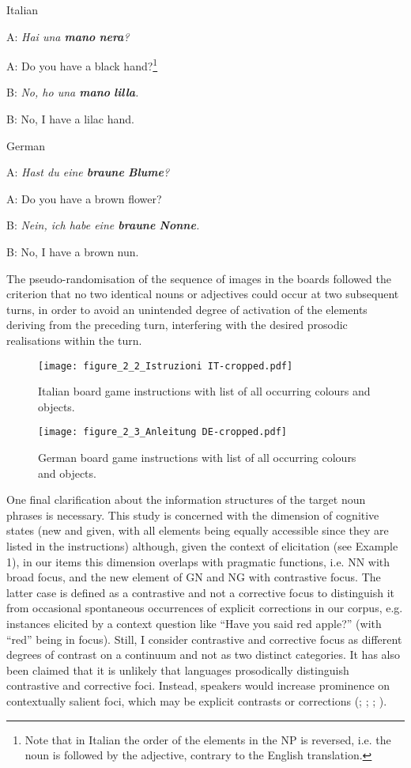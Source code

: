 \ea
\ea Italian

A: \textit{Hai una \textbf{mano} \textbf{nera}?}

A: Do you have a black hand?\footnote{Note that in Italian the order of the elements in the NP is reversed, i.e. the noun is followed by the adjective, contrary to the English translation.}

B: \textit{No, ho una \textbf{mano} \textbf{lilla}.}

B: No, I have a lilac hand.

\ex German

A: \textit{Hast du eine \textbf{braune} \textbf{Blume}?}

A: Do you have a brown flower?

B: \textit{Nein, ich habe eine \textbf{braune} \textbf{Nonne}.}

B: No, I have a brown nun.
\z
\z

The pseudo-randomisation of the sequence of images in the boards followed the criterion that no two identical nouns or adjectives could occur at two subsequent turns, in order to avoid an unintended degree of activation of the elements deriving from the preceding turn, interfering with the desired prosodic realisations within the turn.



\begin{figure}
\texttt{[image: figure\_2\_2\_Istruzioni IT-cropped.pdf]}
\caption{Italian board game instructions with list of all occurring colours and objects.}
\label{fig:2.2}
\end{figure}

  
\begin{figure}
\texttt{[image: figure\_2\_3\_Anleitung DE-cropped.pdf]}
\caption{German board game instructions with list of all occurring colours and objects.}
\label{fig:2.3}
\end{figure}

One final clarification about the information structures of the target noun phrases is necessary. This study is concerned with the dimension of cognitive states (new and given, with all elements being equally accessible since they are listed in the instructions) although, given the context of elicitation (see Example 1), in our items this dimension overlaps with pragmatic functions, i.e. NN with broad focus, and the new element of GN and NG with contrastive focus. The latter case is defined as a contrastive and not a corrective focus to distinguish it from occasional spontaneous occurrences of explicit corrections in our corpus, e.g. instances elicited by a context question like “Have you said red apple?” (with “red” being in focus). Still, I consider contrastive and corrective focus as different degrees of contrast on a continuum and not as two distinct categories. It has also been claimed that it is unlikely that languages prosodically distinguish contrastive and corrective foci. Instead, speakers would increase prominence on contextually salient foci, which may be explicit contrasts or corrections (\citealt{BaumannEtAl2006}; \citealt{Calhoun2009}; \citealt{Féry2013}; \citealt{KüglerCalhoun2020}).

